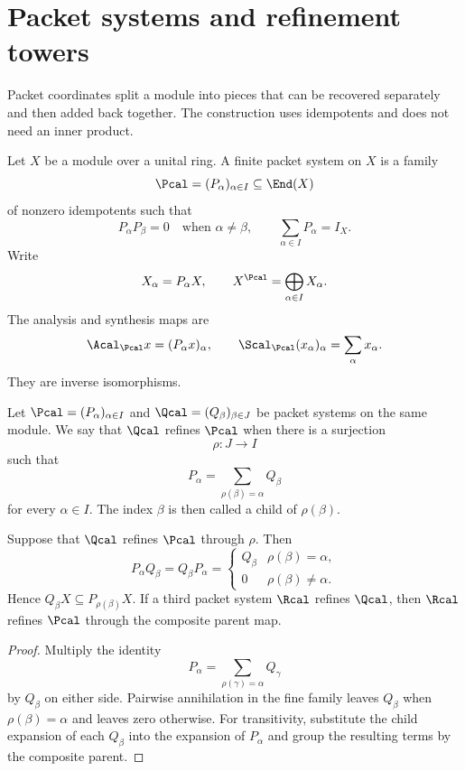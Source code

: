 \section{Packet systems and refinement towers}\label{sec:refinement}

Packet coordinates split a module into pieces that can be recovered separately and then added back together. The construction uses idempotents and does not need an inner product.

\begin{definition}\label{def:packet_system}
Let $X$ be a module over a unital ring.  A finite packet system on $X$ is a family
\[
\Pcal=(P_\alpha)_{\alpha\in I}
\subseteq\End(X)
\]
of nonzero idempotents such that
\[
P_\alpha P_\beta=0
\quad\text{when }\alpha\ne\beta,
\qquad
\sum_{\alpha\in I}P_\alpha=I_X.
\]
Write
\[
X_\alpha=P_\alpha X,
\qquad
X^{\Pcal}=\bigoplus_{\alpha\in I}X_\alpha.
\]
The analysis and synthesis maps are
\[
\Acal_{\Pcal}x=(P_\alpha x)_\alpha,
\qquad
\Scal_{\Pcal}(x_\alpha)_\alpha=\sum_\alpha x_\alpha.
\]
They are inverse isomorphisms.
\end{definition}

\begin{definition}[Refinement]\label{def:refinement}\label{def:refinement-map}
Let $\Pcal=(P_\alpha)_{\alpha\in I}$ and $\Qcal=(Q_\beta)_{\beta\in J}$ be packet systems on the same module.  We say that $\Qcal$ refines $\Pcal$ when there is a surjection
\[
\rho:J\longrightarrow I
\]
such that
\[
P_\alpha=\sum_{\rho(\beta)=\alpha}Q_\beta
\]
for every $\alpha\in I$.  The index $\beta$ is then called a child of $\rho(\beta)$.
\end{definition}

\begin{theorem}\label{thm:children_transitivity}\label{thm:nested-refinement}
Suppose that $\Qcal$ refines $\Pcal$ through $\rho$.  Then
\[
P_\alpha Q_\beta
=
Q_\beta P_\alpha
=
\begin{cases}
Q_\beta & \rho(\beta)=\alpha,\\
0 & \rho(\beta)\ne\alpha.
\end{cases}
\]
Hence $Q_\beta X\subseteq P_{\rho(\beta)}X$.  If a third packet system $\Rcal$ refines $\Qcal$, then $\Rcal$ refines $\Pcal$ through the composite parent map.
\end{theorem}

\begin{proof}
Multiply the identity
\[
P_\alpha=\sum_{\rho(\gamma)=\alpha}Q_\gamma
\]
by $Q_\beta$ on either side.  Pairwise annihilation in the fine family leaves $Q_\beta$ when $\rho(\beta)=\alpha$ and leaves zero otherwise.  For transitivity, substitute the child expansion of each $Q_\beta$ into the expansion of $P_\alpha$ and group the resulting terms by the composite parent.
\end{proof}

